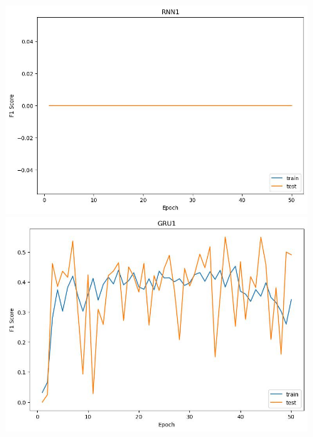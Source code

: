 \documentclass[UTF8]{article}
\begin{document}
\begin{figure}[h]
    \centering
    \begin{minipage}{.43\linewidth}
        \centering
        \includegraphics[width=\linewidth]{../figure/RNN1_F1.jpg}
    \end{minipage}
    \begin{minipage}{.43\linewidth}
        \centering
        \includegraphics[width=\linewidth]{../figure/GRU1_F1.jpg}
    \end{minipage}


\end{figure}
\end{document}
